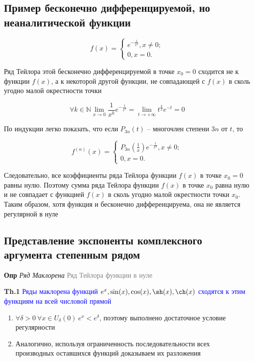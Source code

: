 \subsection{Пример бесконечно дифференцируемой, но неаналитической функции}

\begin{equation}
    f(x) =
    \begin{cases}
        e^{-\frac{1}{x^2}}, x \neq 0; \\
        0, x = 0.
    \end{cases}
\end{equation}

Ряд Тейлора этой бесконечно дифференцируемой в точке $x_0 = 0$ сходится не к функции $f(x)$, а к
некоторой другой функции, не совпадающей с $f(x)$ в сколь угодно малой окрестности точки

\[ \forall k \in \mathbb{N} \lim_{x \to 0} \frac{1}{x^k} e^{-\frac{1}{x^2}} = \lim_{t \to +\infty} t^{\frac{k}{2}} e^{-t} = 0 \]

По индукции легко показать, что если $P_{3n} (t)$ -- многочлен степени $3n$ от $t$, то

\begin{equation}
    f^{(n)}(x) =
    \begin{cases}
        P_{3n} (\frac{1}{x}) e^{-\frac{1}{x^2}}, x \neq 0; \\
        0, x = 0.
    \end{cases}
\end{equation}

Следовательно, все коэффициенты ряда Тейлора функции $f(x)$ в точке $x_0 = 0$ равны нулю.
Поэтому сумма ряда Тейлора функции $f(x)$ в точке $x_0$ равна нулю и не совпадает с функцией $f(x)$ в сколь угодно
малой окрестности точки $x_0$.
Таким образом, хотя функция и бесконечно дифференцируема, она не является регулярной в нуле

\subsection{Представление экспоненты комплексного аргумента степенным рядом}

\textbf{Опр} \textit{Ряд Маклорена} \textcolor{gray}{Ряд Тейлора функции в нуле}

\textbf{Th.1} \textcolor{blue}{Ряды маклорена функций $e^x, \sin(x), \cos(x), \sh(x), \ch(x)$ сходятся к этим
функциям на всей числовой прямой}

\begin{enumerate}
    \item $\forall \delta > 0~\forall x \in U_\delta (0)~e^x < e^\delta$, поэтому выполнено достаточное условие
    регулярности
    \item Аналогично, используя ограниченность последовательности всех производных оставшихся функций доказываем
    их разложения
\end{enumerate}

